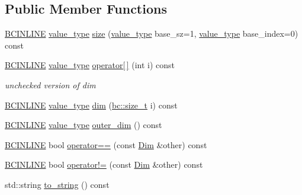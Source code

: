 \subsection*{Public Member Functions}
\begin{DoxyCompactItemize}
\item 
\hyperlink{common_8h_a6699e8b0449da5c0fafb878e59c1d4b1}{B\+C\+I\+N\+L\+I\+NE} \hyperlink{structbc_1_1Dim_3_010_01_4_a561dbc6acbf3e9fe5c4a06aba2f8b968}{value\+\_\+type} \hyperlink{structbc_1_1Dim_3_010_01_4_af26f741bb82cbe0b1426a112cfebdb0b}{size} (\hyperlink{structbc_1_1Dim_3_010_01_4_a561dbc6acbf3e9fe5c4a06aba2f8b968}{value\+\_\+type} base\+\_\+sz=1, \hyperlink{structbc_1_1Dim_3_010_01_4_a561dbc6acbf3e9fe5c4a06aba2f8b968}{value\+\_\+type} base\+\_\+index=0) const
\item 
\hyperlink{common_8h_a6699e8b0449da5c0fafb878e59c1d4b1}{B\+C\+I\+N\+L\+I\+NE} \hyperlink{structbc_1_1Dim_3_010_01_4_a561dbc6acbf3e9fe5c4a06aba2f8b968}{value\+\_\+type} \hyperlink{structbc_1_1Dim_3_010_01_4_a09d031edb6d229770e3fd8f5f684e7d6}{operator\mbox{[}$\,$\mbox{]}} (int i) const
\begin{DoxyCompactList}\small\item\em unchecked version of dim \end{DoxyCompactList}\item 
\hyperlink{common_8h_a6699e8b0449da5c0fafb878e59c1d4b1}{B\+C\+I\+N\+L\+I\+NE} \hyperlink{structbc_1_1Dim_3_010_01_4_a561dbc6acbf3e9fe5c4a06aba2f8b968}{value\+\_\+type} \hyperlink{structbc_1_1Dim_3_010_01_4_abae6a7f5cca642f12146b3b7a1de8af4}{dim} (\hyperlink{namespacebc_aaf8e3fbf99b04b1b57c4f80c6f55d3c5}{bc\+::size\+\_\+t} i) const
\item 
\hyperlink{common_8h_a6699e8b0449da5c0fafb878e59c1d4b1}{B\+C\+I\+N\+L\+I\+NE} \hyperlink{structbc_1_1Dim_3_010_01_4_a561dbc6acbf3e9fe5c4a06aba2f8b968}{value\+\_\+type} \hyperlink{structbc_1_1Dim_3_010_01_4_a39e33cb36054efdd6cb8474a6a93c0fc}{outer\+\_\+dim} () const
\item 
\hyperlink{common_8h_a6699e8b0449da5c0fafb878e59c1d4b1}{B\+C\+I\+N\+L\+I\+NE} bool \hyperlink{structbc_1_1Dim_3_010_01_4_a096ffa430a674f7cb389ac9058ecb11b}{operator==} (const \hyperlink{structbc_1_1Dim}{Dim} \&other) const
\item 
\hyperlink{common_8h_a6699e8b0449da5c0fafb878e59c1d4b1}{B\+C\+I\+N\+L\+I\+NE} bool \hyperlink{structbc_1_1Dim_3_010_01_4_a288aa95e03c09bae5cffcbbc6885138f}{operator!=} (const \hyperlink{structbc_1_1Dim}{Dim} \&other) const
\item 
std\+::string \hyperlink{structbc_1_1Dim_3_010_01_4_a6a6aac045f9a73453c21ee9263ad049c}{to\+\_\+string} () const
\end{DoxyCompactItemize}
